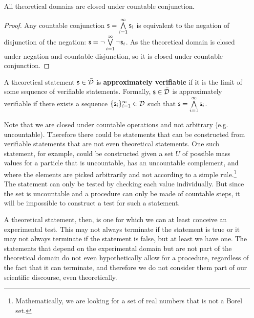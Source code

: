 \documentclass[11pt,letterpaper,fleqn]{memoir} %
\begin{document}
\begin{mathSection}
	\begin{prop}
		All theoretical domains are closed under countable conjunction.
	\end{prop}
	
	\begin{proof}
		Any countable conjunction $\mathsf{s} = \bigwedge\limits_{i=1}^{\infty} \mathsf{s}_i$ is equivalent to the negation of disjunction of the negation: $\mathsf{s} = \neg\bigvee\limits_{i=1}^{\infty} \neg\mathsf{s}_i$. As the theoretical domain is closed under negation and countable disjunction, so it is closed under countable conjunction.  
	\end{proof}

	\begin{defn}\label{def_approximately_verifiable}
		A theoretical statement $\mathsf{s} \in \bar{\mathcal{D}}$ is \textbf{approximately verifiable} if it is the limit of some sequence of verifiable statements. Formally, $\mathsf{s} \in \bar{\mathcal{D}}$ is approximately verifiable if there exists a sequence $\{\mathsf{s}_i\}_{i=1}^{\infty} \in \mathcal{D}$ such that $\mathsf{s} = \bigwedge\limits_{i=1}^{\infty} \mathsf{s}_i$.
	\end{defn}
\end{mathSection}

Note that we are closed under countable operations and not arbitrary (e.g. uncountable). Therefore there could be statements that can be constructed from verifiable statements that are not even theoretical statements. One such statement, for example, could be constructed given a set $U$ of possible mass values for a particle that is uncountable, has an uncountable complement, and where the elements are picked arbitrarily and not according to a simple rule.\footnote{Mathematically, we are looking for a set of real numbers that is not a Borel set.} The statement  can only be tested by checking each value individually. But since the set is uncountable and a procedure can only be made of countable steps, it will be impossible to construct a test for such a statement.

A theoretical statement, then, is one for which we can at least conceive an experimental test. This may not always terminate if the statement is true or it may not always terminate if the statement is false, but at least we have one. The statements that depend on the experimental domain but are not part of the theoretical domain do not even hypothetically allow for a procedure, regardless of the fact that it can terminate, and therefore we do not consider them part of our scientific discourse, even theoretically.
\end{document}

